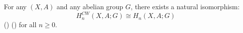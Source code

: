 \begin{theorem} \label{theorem:isomorphism_theorem_between_cellular_homology_and_singular_homology_of_CW_pair_with_coefficients_in_an_abelian_group}
For any  $(X, A)$ and any abelian group $G$, there exists a natural isomorphism:
$$H_n^{CW}(X, A; G) \cong H_n(X, A; G)$$
() ()
for all $n \ge 0$.
\end{theorem}
